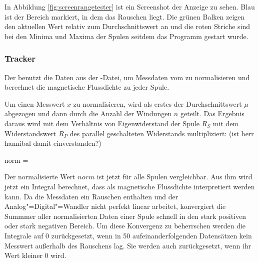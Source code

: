 In Abbildung \ref{fig:screenrangetester} ist ein Screenshot der Anzeige zu sehen.
Blau ist der Bereich markiert, in dem das Rauschen liegt.
Die grünen Balken zeigen den aktuellen Wert relativ zum Durchschnittswert an und die roten Striche sind bei den Minima und Maxima der Spulen seitdem das Programm gestart wurde.

\subsubsection{Tracker}
Der  benutzt die Daten aus der -Datei, um Messdaten vom  zu normalisieren und berechnet die magnetische Flussdichte zu jeder Spule.

Um einen Messwert $x$ zu normalisieren, wird als erstes der Durchschnittswert $\mu$ abgezogen und dann durch die Anzahl der Windungen $n$ geteilt.
Das Ergebnis daraus wird mit dem Verhältnis von Eigenwiderstand der Spule $R_S$ mit dem Widerstandswert $R_P$ des parallel geschalteten Widerstands multipliziert: (\TODO ist herr hannibal damit einverstanden?)

\mathematik
norm =  \cdot {}
\mathematikstop

Der normalisierte Wert $norm$ ist jetzt für alle Spulen vergleichbar.
Aus ihm wird jetzt ein Integral berechnet, dass als magnetische Flussdichte interpretiert werden kann.
Da die Messdaten ein Rauschen enthalten und der Analog"=Digital"=Wandler nicht perfekt linear arbeitet, konvergiert die Summmer aller normalisierten Daten einer Spule schnell in den stark positiven oder stark negativen  Bereich.
Um diese Konvergenz zu beherrschen werden die Integrale auf 0 zurückgesetzt, wenn in 50  aufeinanderfolgenden Datensätzen kein Messwert außerhalb des Rauschens lag.
Sie werden auch zurückgesetzt, wenn ihr Wert kleiner 0 wird.

